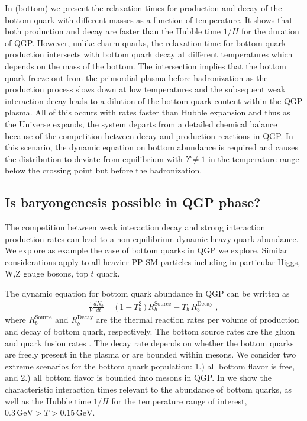 In  (bottom) we present the relaxation times for production and decay of the bottom quark with different masses as a function of temperature. It shows that both production and decay are faster than the Hubble time $1/H$ for the duration of QGP. However, unlike charm quarks, the relaxation time for bottom quark production intersects with bottom quark decay at different temperatures which depends on the mass of the bottom. The intersection implies that the bottom quark freeze-out from the primordial plasma before hadronization as the production process slows down at low temperatures and the subsequent weak interaction decay leads to a dilution of the bottom quark content within the QGP plasma. All of this occurs with rates faster than Hubble expansion and thus as the Universe expands, the system departs from a detailed chemical balance because of the competition between decay and production reactions in QGP. In this scenario, the dynamic equation on bottom abundance is required and causes the distribution to deviate from equilibrium with $\Upsilon\neq1$ in the temperature range below the crossing point but before the hadronization. 



\subsection{Is baryongenesis possible in QGP phase?}\label{Bottom}
The competition between weak interaction decay and strong interaction production rates  can lead  to a non-equilibrium dynamic heavy quark abundance. We explore as example the case of bottom quarks  in QGP we explore. Similar considerations apply to all heavier PP-SM particles including in particular  Higgs, W,Z gauge bosons, top $t$ quark. 
 
The dynamic equation for bottom quark abundance in QGP can be written as 
\begin{align}
\label{Bquark_eq}
\frac{1}{V}\frac{dN_b}{dt}=\big(\,1-\Upsilon^2_{b}\,\big)\,R^{\mathrm{Source}}_{b}-\Upsilon_b\,R^{\mathrm{Decay}}_{b}\;,
\end{align}
where $R^{\mathrm{Source}}_{b}$ and $R^{\mathrm{Decay}}_{b}$ are the thermal reaction rates per volume of production and decay of bottom quark, respectively. The bottom source rates are the gluon and quark fusion rates . The decay rate depends on whether the bottom quarks are freely present in the plasma or are bounded within mesons. We consider two extreme scenarios for the bottom quark population: 1.) all bottom flavor is free, and 2.) all bottom flavor is bounded into mesons in QGP. In   we show the characteristic interaction times relevant to the abundance of bottom quarks, as well as the Hubble time $1/H$ for the temperature range of interest, $0.3\,\mathrm{GeV}> T> 0.15\,\mathrm{GeV}$.

